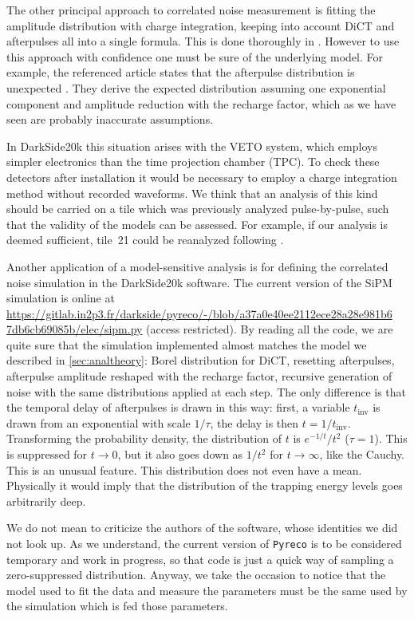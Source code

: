 The other principal approach to correlated noise measurement is fitting the
amplitude distribution with charge integration, keeping into account DiCT and
afterpulses all into a single formula. This is done thoroughly in
\cite{chmill2017}. However to use this approach with confidence one must be
sure of the underlying model. For example, the referenced article states that
the afterpulse distribution is unexpected \cite[app.~A]{chmill2017}. They
derive the expected distribution assuming one exponential component and
amplitude reduction with the recharge factor, which as we have seen are
probably inaccurate assumptions.

In DarkSide20k this situation arises with the VETO system, which employs
simpler electronics than the time projection chamber (TPC). To check these
detectors after installation it would be necessary to employ a charge
integration method without recorded waveforms. We think that an analysis of
this kind should be carried on a tile which was previously analyzed
pulse-by-pulse, such that the validity of the models can be assessed. For
example, if our analysis is deemed sufficient, tile~21 could be reanalyzed
following \cite{chmill2017}.


Another application of a model-sensitive analysis is for defining the
correlated noise simulation in the DarkSide20k software. The current version of
the SiPM simulation is online at
\url{https://gitlab.in2p3.fr/darkside/pyreco/-/blob/a37a0e40ee2112ece28a28e981b6
 7db6cb69085b/elec/sipm.py} (access restricted). By reading all the code, we
are quite sure that the simulation implemented almost matches the model we
described in \autoref{sec:analtheory}: Borel distribution for DiCT, resetting
afterpulses, afterpulse amplitude reshaped with the recharge factor, recursive
generation of noise with the same distributions applied at each step. The only
difference is that the temporal delay of afterpulses is drawn in this way:
first, a variable $t_\text{inv}$ is drawn from an exponential with scale
$1/\tau$, the delay is then $t = 1/t_\text{inv}$. Transforming the probability
density, the distribution of $t$ is $e^{-1/t}/t^2$ ($\tau = 1$). This is
suppressed for $t\to 0$, but it also goes down as $1/t^2$ for $t\to\infty$,
like the Cauchy. This is an unusual feature. This distribution does not even
have a mean. Physically it would imply that the distribution of the trapping
energy levels goes arbitrarily deep.

We do not mean to criticize the authors of the software, whose identities we
did not look up. As we understand, the current version of \texttt{Pyreco} is to
be considered temporary and work in progress, so that code is just a quick way
of sampling a zero-suppressed distribution. Anyway, we take the occasion to
notice that the model used to fit the data and measure the parameters must be
the same used by the simulation which is fed those parameters.
